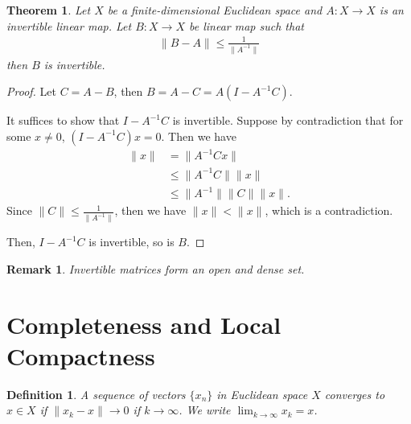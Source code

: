 \documentclass[11pt]{book}
\newtheorem{definition}{Definition}[section]
\newtheorem{theorem}{Theorem}[section]
\newtheorem{remark}{Remark}[section]
\theoremstyle{definition}
\numberwithin{equation}{chapter}
\begin{document}
\begin{theorem}
Let $X$ be a finite-dimensional Euclidean space and $A:X\to X$ is an invertible linear map. Let $B:X\to X$ be linear map such that 
\begin{align*}
    \|B - A\| \leq \frac{1}{\|A^{-1}\|}
\end{align*}
then $B$ is invertible.
\end{theorem}
\begin{proof}
Let $C = A - B$, then $B = A - C = A\left(I - A^{-1}C\right)$. 

It suffices to show that $I - A^{-1}C$ is invertible. Suppose by contradiction that for some $x\neq 0$, $\left(I - A^{-1}C\right)x = 0$. Then we have
\begin{align*}
    \|x\| & = \|A^{-1}C x\| \\
    & \leq \|A^{-1}C\| \|x\| \\
    & \leq \|A^{-1}\| \|C\| \|x\|.
\end{align*}
Since $\|C\| \leq \frac{1}{\|A^{-1}\|}$, then we have $\|x\| < \|x\|$, which is a contradiction. 

Then, $I - A^{-1}C$ is invertible, so is $B$.
\end{proof}

\begin{remark}
Invertible matrices form an open and dense set.
\end{remark}

\medskip

\section{Completeness and Local Compactness}

\begin{definition}
A sequence of vectors $\{x_n\}$ in Euclidean space $X$ converges to $x\in X$ if $\|x_k - x\| \to 0$ if $k\to \infty$. We write $\lim_{k\to\infty}x_k = x$.
\end{definition}

\medskip
\end{document}
